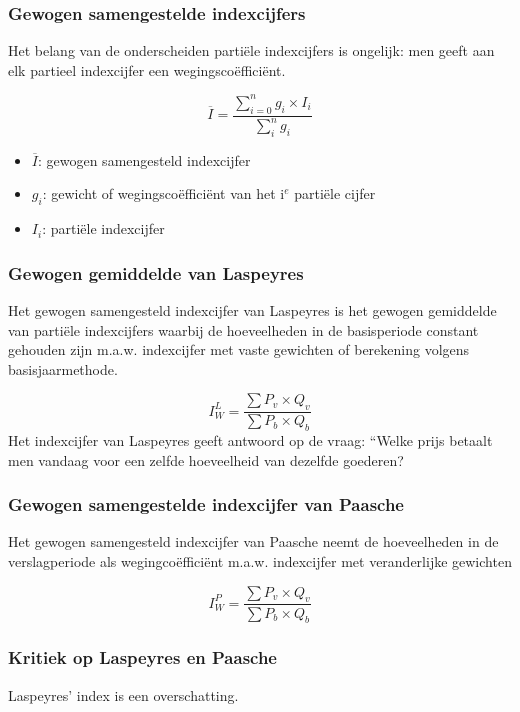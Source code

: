 \documentclass[a4paper,12pt]{article}
\begin{document}
\subsubsection{Gewogen samengestelde indexcijfers}
Het belang van de onderscheiden partiële indexcijfers is ongelijk:
men geeft aan elk partieel indexcijfer een wegingscoëfficiënt.

\begin{equation}
\overline{I}= \frac{\sum^n_{i=0}g_i \times I_i}{\sum^n_i g_i}
\end{equation}
\begin{itemize}
\item $\overline{I}$: gewogen samengesteld indexcijfer
\item $g_i$: gewicht of wegingscoëfficiënt van het i$^e$ partiële cijfer
\item $I_i$: partiële indexcijfer
\end{itemize}

\subsubsection{Gewogen gemiddelde van Laspeyres}
Het gewogen samengesteld indexcijfer van Laspeyres is het gewogen gemiddelde van partiële indexcijfers waarbij de
hoeveelheden in de basisperiode constant gehouden zijn m.a.w. indexcijfer met vaste gewichten of berekening volgens basisjaarmethode.

\begin{equation}
I^L_W=\frac{\sum P_v \times Q_v}{\sum P_b \times Q_b}
\end{equation}
Het indexcijfer van Laspeyres geeft antwoord op de vraag: “Welke prijs betaalt men vandaag voor een zelfde hoeveelheid van dezelfde goederen?

\subsubsection{Gewogen samengestelde indexcijfer van Paasche}
Het gewogen samengesteld indexcijfer van Paasche neemt de hoeveelheden in de verslagperiode als wegingcoëfficiënt m.a.w. indexcijfer met veranderlijke gewichten

\begin{equation}
I^P_W=\frac{\sum P_v \times Q_v}{\sum P_b \times Q_b}
\end{equation}

\subsubsection{Kritiek op Laspeyres en Paasche}
Laspeyres' index is een overschatting.
\end{document}
